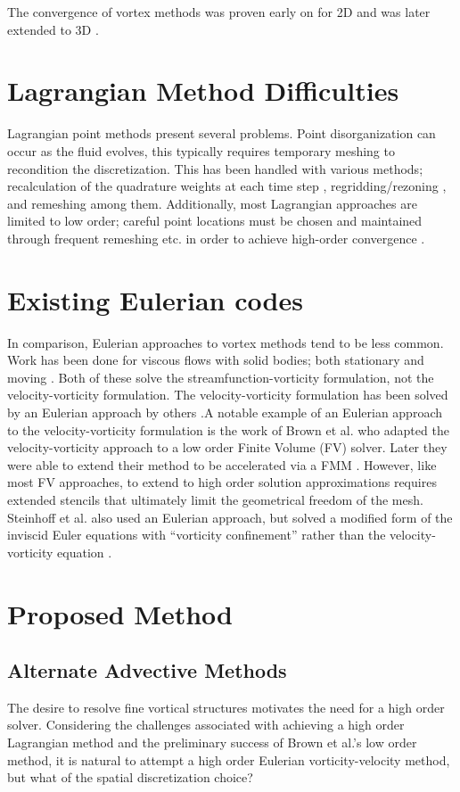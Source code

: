 \documentclass[letterpaper,12pt]{report}
\begin{document}
The convergence of vortex methods was proven early on for 2D \cite{Convg2D} and was later extended to 3D \cite{Convg3D}.

\section{Lagrangian Method Difficulties}
Lagrangian point methods present several problems. Point disorganization can occur as the fluid evolves, this typically requires temporary meshing to recondition the discretization. This has been handled with various methods; recalculation of the quadrature weights at each time step \cite{Remesh2,Remesh3}, regridding/rezoning \cite{Remesh4}, and remeshing \cite{Remesh5} among them. Additionally, most Lagrangian approaches are limited to low order; careful point locations must be chosen and maintained through frequent remeshing etc. in order to achieve high-order convergence \cite{Strain1997}.

\section{Existing Eulerian codes}
In comparison, Eulerian approaches to vortex methods tend to be less common. Work has been done for viscous flows with solid bodies; both stationary \cite{MiscMeth3} and moving \cite{MiscMeth2}. Both of these solve the streamfunction-vorticity formulation, not the velocity-vorticity formulation. The velocity-vorticity formulation has been solved by an Eulerian approach by others \cite{MiscMeth4}.A notable example of an Eulerian approach to the velocity-vorticity formulation is the work of Brown et al. \cite{Brown2000} who adapted the velocity-vorticity approach to a low order Finite Volume (FV) solver. Later they were able to extend their method to be accelerated via a FMM \cite{Brown2004}. However, like most FV approaches, to extend to high order solution approximations requires extended stencils that ultimately limit the geometrical freedom of the mesh. Steinhoff et al. also used an Eulerian approach, but solved a modified form of the inviscid Euler equations with ``vorticity confinement'' rather than the velocity-vorticity equation \cite{SteinhoffUnderhill1994}.
%
\section{Proposed Method}
\subsection{Alternate Advective Methods}
The desire to resolve fine vortical structures motivates the need for a high order solver. Considering the challenges associated with achieving a high order Lagrangian method and the preliminary success of Brown et al.'s low order method, it is natural to attempt a high order Eulerian vorticity-velocity method, but what of the spatial discretization choice?
\end{document}
